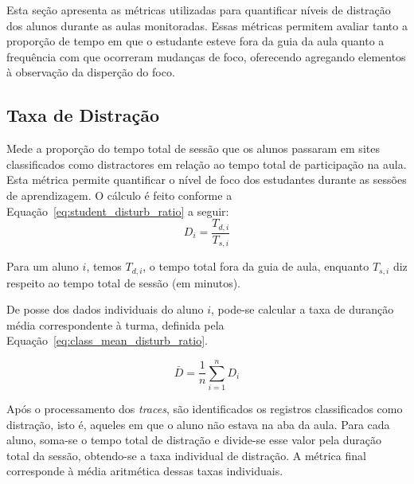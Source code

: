 Esta seção apresenta as métricas utilizadas para quantificar níveis de distração dos alunos durante as aulas monitoradas. Essas métricas permitem avaliar tanto a proporção de tempo em que o estudante esteve fora da guia da aula quanto a frequência com que ocorreram mudanças de foco, oferecendo agregando elementos à observação da disperção do foco.

\subsection{Taxa de Distração}
Mede a proporção do tempo total de sessão que os alunos passaram em sites classificados como distractores em relação ao tempo total de participação na aula. Esta métrica permite quantificar o nível de foco dos estudantes durante as sessões de aprendizagem. O cálculo é feito conforme a Equação~\ref{eq:student_disturb_ratio} a seguir:
\begin{equation}\label{eq:student_disturb_ratio}
D_i = \frac{T_{d,i}}{T_{s,i}}
\end{equation}

Para um aluno $i$, temos $T_{d,i}$, o tempo total fora da guia de aula, enquanto $T_{s,i}$ diz respeito ao tempo total de sessão (em minutos). 

De posse dos dados individuais do aluno $i$, pode-se calcular a taxa de duranção média correspondente à turma, definida pela Equação~\ref{eq:class_mean_disturb_ratio}.

\begin{equation}\label{eq:class_mean_disturb_ratio}
\bar{D} = \frac{1}{n} \sum_{i=1}^{n} D_i
\end{equation}

% 

Após o processamento dos \textit{traces}, são identificados os registros classificados como distração, isto é, aqueles em que o aluno não estava na aba da aula. Para cada aluno, soma-se o tempo total de distração e divide-se esse valor pela duração total da sessão, obtendo-se a taxa individual de distração. A métrica final corresponde à média aritmética dessas taxas individuais.



